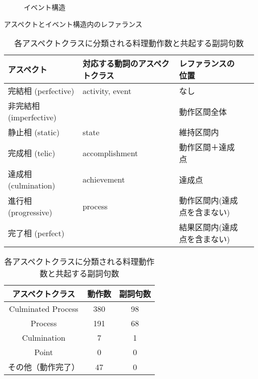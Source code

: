 \begin{figure}[h]
  \begin{center}
	\caption{イベント構造}\label{ibento}
  \end{center}
\end{figure}


\begin{table}[ht]
 \caption{アスペクトとイベント構造内のレファランス}\label{asibe}
 \begin{center}
 \begin{tabular}{|l|l|l|l|} \hline
  アスペクト & 対応する動詞のアスペクトクラス & レファランスの位置 \\ \hline
  完結相 (perfective)& activity, event &  なし \\ 
  非完結相 (imperfective) &  & 動作区間全体 \\ 
  静止相 (static) & state & 維持区間内\\ 
  完成相 (telic)& accomplishment& 動作区間＋達成点 \\
  達成相 (culmination)& achievement & 達成点 \\ 
  進行相 (progressive)& process & 動作区間内(達成点を含まない)\\ 
  完了相 (perfect)&  & 結果区間内(達成点を含まない) \\ \hline  
 \end{tabular} 
 \end{center}
\vspace{2mm}
 \begin{center}
 \caption{各アスペクトクラスに分類される料理動作数と共起する副詞句数}
 \label{tab:1}
    \begin{tabular}{|c|c|c|} \hline
     アスペクトクラス     & 動作数  & 副詞句数  \\ \hline\hline
     Culminated Process   & 380     & 98        \\ \hline
     Process              & 191     & 68        \\ \hline
     Culmination          & 7       & 1         \\ \hline
     Point                & 0       & 0         \\ \hline\hline
     その他（動作完了）   & 47      & 0         \\ \hline     
    \end{tabular}
\end{center}
\end{table}

